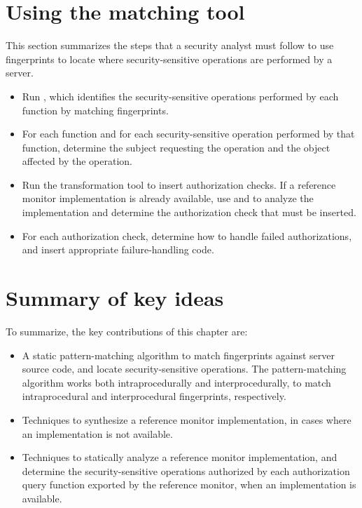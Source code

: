 \section{Using the matching tool}
\label{chapter:matching:usage}

This section summarizes the steps that a security analyst must follow to use
fingerprints to locate where security-sensitive operations are performed by a
server.

\begin{itemize}

\item Run , which identifies the
security-sensitive operations performed by each function by matching
fingerprints.

\item For each function and for each security-sensitive operation performed
by that function, determine the subject requesting the operation and the object
affected by the operation.

\item Run the transformation tool to insert authorization checks. If a
reference monitor implementation is already available, use
 and  to analyze
the implementation and determine the authorization check that must be inserted.

\item For each authorization check, determine how to handle failed
authorizations, and insert appropriate failure-handling code.

\end{itemize}


\section{Summary of key ideas}
\label{chapter:matching:keyideas}

To summarize, the key contributions of this chapter are:

\begin{itemize}
%
\item A static pattern-matching algorithm to match fingerprints against server
source code, and locate security-sensitive operations. The pattern-matching
algorithm works both intraprocedurally and interprocedurally, to match
intraprocedural and interprocedural fingerprints, respectively.
%
\item Techniques to synthesize a reference monitor implementation, in cases
where an implementation is not available.
%
\item Techniques to statically analyze a reference monitor implementation, and
determine the security-sensitive operations authorized by each authorization
query function exported by the reference monitor, when an implementation is
available.
%
\end{itemize}

